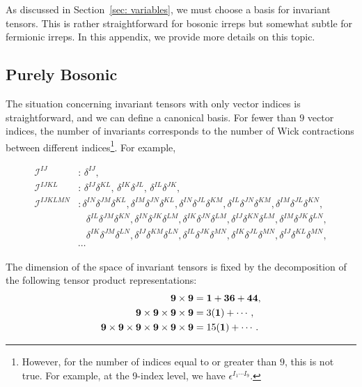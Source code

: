 \documentclass[11pt]{article}
\begin{document}
As discussed in Section~\ref{sec: variables}, we must choose a basis for invariant tensors. This is rather straightforward for bosonic irreps but somewhat subtle for fermionic irreps. In this appendix, we provide more details on this topic.

\subsection{Purely Bosonic}\label{app: purebos}

The situation concerning invariant tensors with only vector indices is straightforward, and we can define a canonical basis. For fewer than $9$ vector indices, the number of invariants corresponds to the number of Wick contractions between different indices\footnote{However, for the number of indices equal to or greater than $9$, this is not true. For example, at the 9-index level, we have $\epsilon^{I_1 \cdots I_9}$.}. %
For example,
\begin{small}
\begin{equation}
\begin{split}
    \mathcal{I}^{IJ}&: \, \delta^{IJ}, \\
    \mathcal{I}^{IJKL}&: \,\delta^{IJ}\delta^{KL},\, \delta^{IK}\delta^{JL},\, \delta^{IL}\delta^{JK}, \\
    \mathcal{I}^{IJKLMN}&: \delta^{IN}\delta^{JM}\delta^{KL}, \delta^{IM}\delta^{JN}\delta^{KL}, \delta^{IN}\delta^{JL}\delta^{KM}, \delta^{IL}\delta^{JN}\delta^{KM}, \delta^{IM}\delta^{JL}\delta^{KN}, \\
    & \,\,\,\,\,\delta^{IL}\delta^{JM}\delta^{KN}, \delta^{IN}\delta^{JK}\delta^{LM}, \delta^{IK}\delta^{JN}\delta^{LM}, \delta^{IJ}\delta^{KN}\delta^{LM}, \delta^{IM}\delta^{JK}\delta^{LN}, \\
    & \,\,\,\,\, \delta^{IK}\delta^{JM}\delta^{LN}, \delta^{IJ}\delta^{KM}\delta^{LN}, \delta^{IL}\delta^{JK}\delta^{MN}, \delta^{IK}\delta^{JL}\delta^{MN}, \delta^{IJ}\delta^{KL}\delta^{MN}, \\
    & \cdots
\end{split}
\end{equation}
\end{small}

The dimension of the space of invariant tensors is fixed by the decomposition of the following tensor product representations:
\begin{equation}\label{eq: counting}
    \begin{split}
        {\bf 9} \times \mathbf{9}  &= \mathbf{1} + \mathbf{36} + \mathbf{44}, \\
        {\bf 9} \times \mathbf{9} \times \mathbf{9} \times \mathbf{9} &= 3 (\mathbf{1}) + \cdots, \\
        {\bf 9} \times \mathbf{9} \times \mathbf{9} \times \mathbf{9} \times \mathbf{9} \times \mathbf{9} &= 15 (\mathbf{1}) + \cdots.
    \end{split}
\end{equation}
\end{document}
